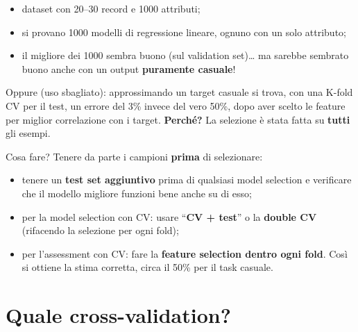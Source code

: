 \begin{itemize}
\tightlist
\item
  dataset con 20--30 record e 1000 attributi;
\item
  si provano 1000 modelli di regressione lineare, ognuno con un solo
  attributo;
\item
  il migliore dei 1000 sembra buono (sul validation set)\ldots{} ma
  sarebbe sembrato buono anche con un output \textbf{puramente casuale}!
\end{itemize}

Oppure (uso sbagliato): approssimando un target casuale si trova, con
una K-fold CV per il test, un errore del 3\% invece del vero 50\%, dopo
aver scelto le feature per miglior correlazione con i target.
\textbf{Perché?} La selezione è stata fatta su \textbf{tutti} gli
esempi.

Cosa fare? Tenere da parte i campioni \textbf{prima} di selezionare:

\begin{itemize}
\tightlist
\item
  tenere un \textbf{test set aggiuntivo} prima di qualsiasi model
  selection e verificare che il modello migliore funzioni bene anche su
  di esso;
\item
  per la model selection con CV: usare ``\textbf{CV + test}'' o la
  \textbf{double CV} (rifacendo la selezione per ogni fold);
\item
  per l'assessment con CV: fare la \textbf{feature selection dentro ogni
  fold}. Così si ottiene la stima corretta, circa il 50\% per il task
  casuale.
\end{itemize}

\section{Quale cross-validation?}\label{quale-cross-validation}

